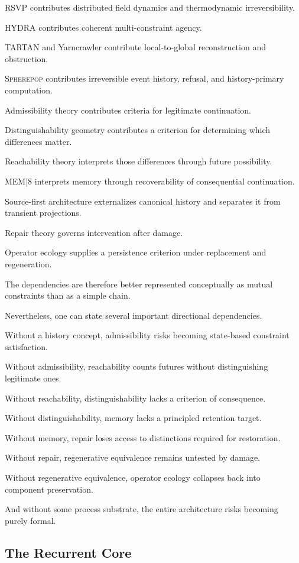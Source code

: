 \documentclass[11pt]{article}
\theoremstyle{remark}
\newcommand{\RSVP}{\textsc{RSVP}}
\newcommand{\HYDRA}{\textsc{HYDRA}}
\newcommand{\TARTAN}{\textsc{TARTAN}}
\newcommand{\MEM}{\textsc{MEM|8}}
\newcommand{\Spherepop}{\textsc{Spherepop}}
\begin{document}
\RSVP{} contributes distributed field dynamics and thermodynamic irreversibility.

\HYDRA{} contributes coherent multi-constraint agency.

\TARTAN{} and Yarncrawler contribute local-to-global reconstruction and obstruction.

\Spherepop{} contributes irreversible event history, refusal, and history-primary computation.

Admissibility theory contributes criteria for legitimate continuation.

Distinguishability geometry contributes a criterion for determining which differences matter.

Reachability theory interprets those differences through future possibility.

\MEM{} interprets memory through recoverability of consequential continuation.

Source-first architecture externalizes canonical history and separates it from transient projections.

Repair theory governs intervention after damage.

Operator ecology supplies a persistence criterion under replacement and regeneration.

The dependencies are therefore better represented conceptually as mutual constraints than as a simple chain.

Nevertheless, one can state several important directional dependencies.

Without a history concept, admissibility risks becoming state-based constraint satisfaction.

Without admissibility, reachability counts futures without distinguishing legitimate ones.

Without reachability, distinguishability lacks a criterion of consequence.

Without distinguishability, memory lacks a principled retention target.

Without memory, repair loses access to distinctions required for restoration.

Without repair, regenerative equivalence remains untested by damage.

Without regenerative equivalence, operator ecology collapses back into component preservation.

And without some process substrate, the entire architecture risks becoming purely formal.

\subsection{The Recurrent Core}
\end{document}
